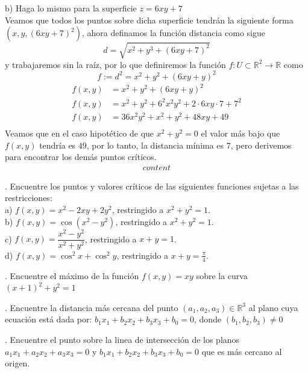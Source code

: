 \documentclass[letterpaper]{article}
\newcommand{\R}{\mathds{R}}
\renewcommand{\*}{\cdot}
\theoremstyle{definition}
\begin{document}
b) Haga lo mismo para la superficie $z = 6xy + 7$\\

Veamos que todos los puntos sobre dicha superficie tendrán la siguiente forma $ (x, y, (6xy + 7)^2)  $, ahora definamos la función distancia como sigue \[ d = \sqrt{x^2 + y^3 + (6xy +7)^2} \]y trabajaremos sin la raíz, por lo que definiremos la función $ f: U \subset \R^2 \to \R $ como $$ f := d^2 =x^2 + y^2 + (6xy + y)^2 $$
\begin{align*}
	f(x,y) &= x^2 + y^2 + (6xy + y)^2 \\
	f(x,y) &= x^2 + y^2 + 6^2x^2y^2 +2\*6xy\*7 +7^2 \\
	f(x,y) &= 36x^2y^2  + x^2 + y^2 + 48xy + 49 \\
\end{align*}
Veamos que en el caso hipotético de que $ x^2 + y^2 = 0 $ el valor más bajo que $ f(x,y) $ tendría es $ 49 $, por lo tanto, la distancia mínima es $ 7 $, pero derivemos para encontrar los demás puntos críticos.
\begin{align*}
	content
\end{align*}

. Encuentre los puntos y valores críticos de las siguientes funciones sujetas a las restricciones:\\


a) $f(x,y) = x^2 - 2xy + 2y^2$, restringido a $x^2 + y^2 =1$.\\

b) $f(x,y) = \cos{(x^2 - y^2)}{}$, restringido a $x^2 + y^2 =1$.\\

c) $f(x,y) = \dfrac{x^2 - y^2}{x^2 + y^2}$, restringido a $x + y =1$.\\

d) $f(x,y) = \cos^2{x} +\cos^2{y}$, restringido a $x + y =\frac{\pi}{4}$.


. Encuentre el máximo de la función $f(x,y) = xy$ sobre la curva $(x +1)^2 + y^2 =1$

. Encuentre la distancia más cercana del punto $(a_1, a_2, a_3) \in \mathbb{R}^3$ al plano cuya ecuación está dada por: $b_1x_1 + b_2x_2 + b_3x_3 + b_0 = 0$, donde $(b_1, b_2, b_3) \neq 0 $

. Encuentre el punto sobre la linea de intersección de los planos  $a_1x_1 + a_2x_2 + a_3x_3 = 0$ y $b_1x_1 + b_2x_2 + b_3x_3 + b_0 = 0$ que es más cercano al origen.
\end{document}
